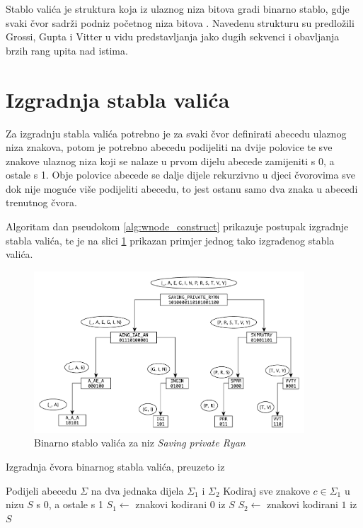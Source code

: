 Stablo valića je struktura koja iz ulaznog niza bitova gradi binarno stablo, gdje svaki čvor sadrži podniz početnog niza bitova \cite{grossi} \cite{bowe-th}. Navedenu strukturu su predložili Grossi, Gupta i Vitter \cite{bowe-th} u vidu predstavljanja jako dugih sekvenci i obavljanja brzih rang upita nad istima.

\section{Izgradnja stabla valića}

Za izgradnju stabla valića potrebno je za svaki čvor definirati abecedu ulaznog niza znakova, potom je potrebno abecedu podijeliti na dvije polovice te sve znakove ulaznog niza koji se nalaze u prvom dijelu abecede zamijeniti s 0, a ostale s 1. Obje polovice abecede se dalje dijele rekurzivno u djeci čvorovima sve dok nije moguće više podijeliti abecedu, to jest ostanu samo dva znaka u abecedi trenutnog čvora.

Algoritam dan pseudokom \ref{alg:wnode_construct} prikazuje postupak izgradnje stabla valića, te je na slici \ref{fig:wavelet_tree} prikazan primjer jednog tako izgrađenog stabla valića.

\begin{figure}[H]
	\centering
	\includegraphics[width=0.9\textwidth]{img/wavelet_tree.pdf}
	\caption{Binarno stablo valića za niz \emph{Saving private Ryan}}
	\label{fig:wavelet_tree}
\end{figure}

\begin{algorithm}[H]
  \caption{Izgradnja čvora binarnog stabla valića, preuzeto iz \cite{breberic}}
  \begin{algorithmic}[1]
    \State Podijeli abecedu $\Sigma$ na dva jednaka dijela $\Sigma_1$ i $\Sigma_2$
    \State Kodiraj sve znakove $c \in \Sigma_1$ u nizu $S$ s 0, a ostale s 1
      \State $S_1 \gets$ znakovi kodirani $0$ iz $S$ \State{}
    \EndIf
      \State $S_2 \gets$ znakovi kodirani $1$ iz $S$ \State{}
    \EndIf
    \EndFunction
  \end{algorithmic}
  \label{alg:wnode_construct}
\end{algorithm}

